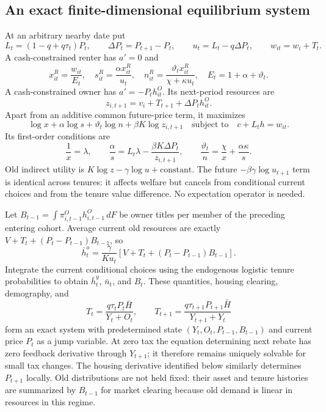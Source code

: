 \documentclass[11pt]{article}
\newcommand{\dd}{\,d}
\newcommand{\HH}{\bar H}
\newcommand{\tht}{\vartheta}
\begin{document}
\subsection{An exact finite-dimensional equilibrium system}
At an arbitrary nearby date put
\[
 L_t=(1-q+q\tau_t)P_t,\qquad \Delta P_t=P_{t+1}-P_t,
 \qquad u_t=L_t-q\Delta P_t,\qquad w_{it}=w_i+T_t.
\]
A cash-constrained renter has $a'=0$ and
\begin{equation}
 x_{it}^R=\frac{w_{it}}{E_t},\quad
 s_{it}^R=\frac{\alpha x_{it}^R}{u_t},\quad
 n_{it}^R=\frac{\tht_t x_{it}^R}{\chi+\kappa u_t},\quad
 E_t=1+\alpha+\tht_t.\label{eq:demandRdynamic}
\end{equation}
A cash-constrained owner has $a'=-P_th_{it}^O$. Its next-period resources are
\begin{equation}
 z_{i,t+1}=v_i+T_{t+1}+\Delta P_t h_{it}^O.\label{eq:dynamicz}
\end{equation}
Apart from an additive common future-price term, it maximizes
\[
 \log x+\alpha\log s+\tht_t\log n+\beta K\log z_{i,t+1}
 \quad\text{subject to}\quad c+L_th=w_{it}.
\]
Its first-order conditions are
\begin{equation}
 \frac1x=\lambda,\qquad
 \frac\alpha s=L_t\lambda-\frac{\beta K\Delta P_t}{z_{i,t+1}},\qquad
 \frac{\tht_t}n=\frac\chi x+\frac{\alpha\kappa}s.\label{eq:demandOdynamic}
\end{equation}
Old indirect utility is $K\log z-\gamma\log u+\text{constant}$. The future $-\beta\gamma\log u_{t+1}$ term is identical across tenures: it affects welfare but cancels from conditional current choices and from the tenure value difference. No expectation operator is needed.

Let
$B_{t-1}=\int\pi_{i,t-1}^O h_{i,t-1}^O\dd F$
be owner titles per member of the preceding entering cohort. Average current old resources are exactly
$V+T_t+(P_t-P_{t-1})B_{t-1}$, so
\begin{equation}
 \bar h_t^o=\frac\gamma{K u_t}
       [V+T_t+(P_t-P_{t-1})B_{t-1}].\label{eq:oldaggregate}
\end{equation}
Integrate the current conditional choices using the endogenous logistic tenure probabilities to obtain $\bar h_t^y$, $\bar n_t$, and $B_t$. These quantities, housing clearing, demography, and
\[
 T_t=\frac{q\tau_tP_t\HH}{Y_t+O_t},\qquad
 T_{t+1}=\frac{q\tau_{t+1}P_{t+1}\HH}{Y_{t+1}+Y_t}
\]
form an exact system with predetermined state $(Y_t,O_t,P_{t-1},B_{t-1})$ and current price $P_t$ as a jump variable. At zero tax the equation determining next rebate has zero feedback derivative through $Y_{t+1}$; it therefore remains uniquely solvable for small tax changes. The housing derivative identified below similarly determines $P_{t+1}$ locally. Old distributions are not held fixed: their asset and tenure histories are summarized by $B_{t-1}$ for market clearing because old demand is linear in resources in this regime.
\end{document}
